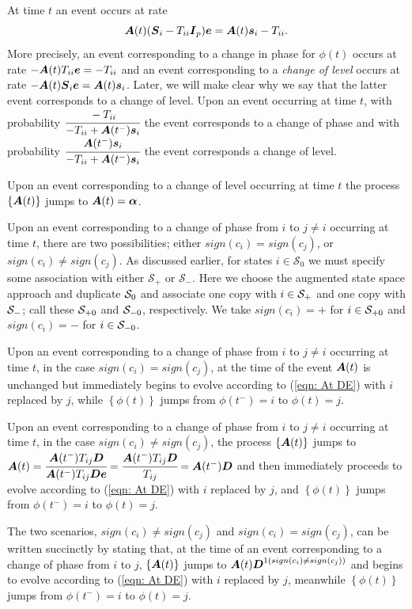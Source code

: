 At time \(t\) an event occurs at rate 
\[\boldsymbol A(t) (\boldsymbol{S}_i - T_{ii}\boldsymbol{I}_p)\boldsymbol e = \boldsymbol A(t)\boldsymbol s_i - T_{ii}.\]
More precisely, an event corresponding to a change in phase for \({\phi}(t)\) occurs at rate \(-\boldsymbol A(t) T_{ii}\boldsymbol e = -T_{ii}\) and an event corresponding to a \emph{change of level} occurs at rate \(-\boldsymbol A(t) \boldsymbol{S}_i\boldsymbol e = \boldsymbol A(t) \boldsymbol s_i\). Later, we will make clear why we say that the latter event corresponds to a change of level. Upon an event occurring at time \(t\), with probability \(\cfrac{-T_{ii}}{-T_{ii} + \boldsymbol A({t^-})\boldsymbol s_i}\) the event corresponds to a change of phase and with probability \(\cfrac{\boldsymbol A({t^-})\boldsymbol s_i}{-T_{ii} + \boldsymbol A({t^-})\boldsymbol s_i}\) the event corresponds a change of level. 

Upon an event corresponding to a change of level occurring at time \(t\) the process \(\{\boldsymbol A(t)\}\) jumps to
\(\boldsymbol A(t) = \boldsymbol \alpha\). 

Upon an event corresponding to a change of phase from \(i\) to \(j\neq i\) occurring at time \(t\), there are two possibilities; either \(sign(c_i)=sign(c_j)\), or \(sign(c_i)\neq sign(c_j)\). As discussed earlier, for states \(i\in\mathcal S_0\) we must specify some association with either \(\mathcal S_+\) or \(\mathcal S_-\). Here we choose the augmented state space approach and duplicate \(\mathcal{S}_0\) and associate one copy with \(i\in\mathcal{S}_+\) and one copy with \(\mathcal{S}_-\); call these \(\mathcal{S}_{+0}\) and \(\mathcal{S}_{-0}\), respectively. We take \(sign(c_i)=+\) for \(i\in\mathcal{S}_{+0}\) and \(sign(c_i)=-\) for \(i\in\mathcal{S}_{-0}\).

Upon an event corresponding to a change of phase from \(i\) to \(j\neq i\) occurring at time \(t\), in the case \(sign(c_i)=sign(c_j)\), at the time of the event \(\boldsymbol A(t)\) is unchanged but immediately begins to evolve according to (\ref{eqn: At DE}) with \(i\) replaced by \(j\), while \(\left\{{\phi}(t)\right\}\) jumps from \({\phi}(t^-)=i\) to \({\phi}(t)=j\). 

Upon an event corresponding to a change of phase from \(i\) to \(j\neq i\) occurring at time \(t\), in the case \(sign(c_i)\neq sign(c_j)\), the process \(\{\boldsymbol A(t)\}\) jumps to \(\boldsymbol A(t) = \cfrac{\boldsymbol A({t^-}) T_{ij}\boldsymbol{D}}{\boldsymbol A({t^-}) T_{ij} \boldsymbol{D} \boldsymbol e} = \cfrac{\boldsymbol A({t^-}) T_{ij}\boldsymbol{D}}{T_{ij} } = \boldsymbol A({t^-}) \boldsymbol{D} \) and then immediately proceeds to evolve according to (\ref{eqn: At DE}) with \(i\) replaced by \(j\), and \(\left\{{\phi}(t)\right\}\) jumps from \({\phi}(t^-)=i\) to \({\phi}(t)=j\). 

The two scenarios, \(sign(c_i)\neq sign(c_j)\) and \(sign(c_i)= sign(c_j)\), can be written succinctly by stating that, at the time of an event corresponding to a change of phase from \(i\) to \(j\), \(\{\boldsymbol A(t)\}\) jumps to \(\boldsymbol A(t)\boldsymbol{D}^{1(sign(c_i)\neq sign(c_j))}\) and begins to evolve according to (\ref{eqn: At DE}) with \(i\) replaced by \(j\), meanwhile \(\left\{{\phi}(t)\right\}\) jumps from \(\phi(t^-)=i\) to \(\phi(t)=j\). %

